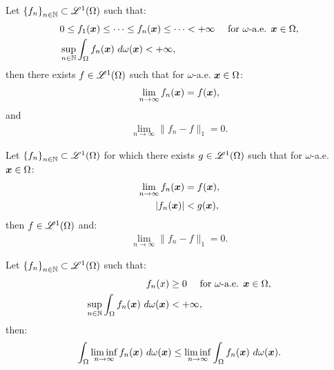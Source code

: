 \begin{theorem}
    Let $\left\{ f_n \right\}_{n \in \mathbb{N}} \subset \mathscr{L}^{1}(\Omega)$ such that:
    \begin{align}
        & 0 \leq f_1(\bm{x}) \leq \dots \leq f_n(\bm{x}) \leq \dots < +\infty \quad \text{ for } \omega \text{-a.e. } \bm{x} \in \Omega, \\
        & \sup_{n \in \mathbb{N}} \int_\Omega f_n(\bm{x}) ~ d \omega(\bm{x}) < +\infty,
    \end{align}
    then there exists $f \in \mathscr{L}^{1}(\Omega)$ such that for $\omega$-a.e. $\bm{x} \in \Omega$:
    \begin{gather}
        \lim_{n \rightarrow \infty} f_n(\bm{x}) = f(\bm{x}),
    \end{gather}
    and
    \begin{gather}
        \lim_{n \rightarrow \infty} \lVert f_n - f \rVert_1 = 0.
    \end{gather}
\end{theorem}

\begin{theorem}
    Let $\left\{ f_n \right\}_{n \in \mathbb{N}} \subset \mathscr{L}^{1}(\Omega)$ for which there exists $g \in \mathscr{L}^{1}(\Omega)$ such that for $\omega$-a.e. $\bm{x} \in \Omega$:
    \begin{align}
        \lim_{n \rightarrow \infty} f_n(\bm{x}) & = f(\bm{x}), \\
        \lvert f_n(\bm{x}) \rvert & < g(\bm{x}),
    \end{align}
    then $f \in \mathscr{L}^{1}(\Omega)$ and:
    \begin{gather}
        \lim_{n \rightarrow \infty} \lVert f_n - f \rVert_1 = 0.
    \end{gather}
\end{theorem}

\begin{lemma}[Fatou]
    Let $\left\{ f_n \right\}_{n \in \mathbb{N}} \subset \mathscr{L}^{1}(\Omega)$ such that:
    \begin{align}
        f_n(x) & \geq 0 \quad \text{ for } \omega \text{-a.e. } \bm{x} \in \Omega, \\
        \sup_{n \in \mathbb{N}} \int_{\Omega} f_n(\bm{x}) ~ d \omega(\bm{x}) & < +\infty,
    \end{align}
    then:
    \begin{gather}
        \int_{\Omega} \liminf_{n \rightarrow \infty} f_n(\bm{x}) ~ d \omega(\bm{x}) \leq \liminf_{n \rightarrow \infty} \int_{\Omega} f_n(\bm{x}) ~ d \omega(\bm{x}).
    \end{gather}
\end{lemma}


